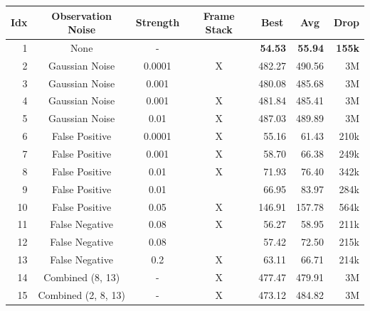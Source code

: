 \begin{table}[ht!]
    \begin{center}
        \begin{tabular}{rcccrrr}
            \toprule
            \multicolumn{1}{c}{Idx} & \multicolumn{1}{c}{Observation Noise} & \multicolumn{1}{c}{Strength} & \multicolumn{1}{c}{Frame Stack} & \multicolumn{1}{c}{Best} & \multicolumn{1}{c}{Avg} & \multicolumn{1}{c}{Drop}\\
            \midrule
            1 & None & - &  & \textbf{54.53} & \textbf{55.94} & \textbf{155k} \\
            \midrule
            2 & Gaussian Noise & 0.0001 & X & 482.27 & 490.56 & 3M \\
            3 & Gaussian Noise & 0.001 &  & 480.08 & 485.68 & 3M \\
            4 & Gaussian Noise & 0.001 & X & 481.84 & 485.41 & 3M \\
            5 & Gaussian Noise & 0.01 & X & 487.03 & 489.89 & 3M \\
            6 & False Positive & 0.0001 & X & 55.16 & 61.43 & 210k \\
            7 & False Positive & 0.001 & X & 58.70 & 66.38 & 249k \\
            8 & False Positive & 0.01 & X & 71.93 & 76.40 & 342k \\
            9 & False Positive & 0.01 &  & 66.95 & 83.97 & 284k \\
            10 & False Positive & 0.05 & X & 146.91 & 157.78 & 564k \\
            11 & False Negative & 0.08 & X & 56.27 & 58.95 & 211k \\
            12 & False Negative & 0.08 &  & 57.42 & 72.50 & 215k \\
            13 & False Negative & 0.2 & X & 63.11 & 66.71 & 214k \\
            \midrule
            14 & Combined (8, 13) & - & X & 477.47 & 479.91 & 3M \\
            15 & Combined (2, 8, 13) & - & X & 473.12 & 484.82 & 3M \\
            \bottomrule
        \end{tabular}
    \end{center}

\end{table}

